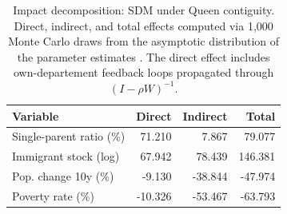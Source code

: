 \begin{table}[ht]
\centering
\caption{Impact decomposition: SDM under Queen contiguity. Direct, indirect, and total effects computed via 1{,}000 Monte Carlo draws from the asymptotic distribution of the parameter estimates \citep{lesage2009}. The direct effect includes own-departement feedback loops propagated through $(I - \rho W)^{-1}$.}
\label{tab:impacts_combined}
\begin{tabular}{lrrr}
  \toprule
  Variable & Direct & Indirect & Total \\
  \midrule
  Single-parent ratio (\%) & 71.210 & 7.867 & 79.077 \\
  Immigrant stock (log) & 67.942 & 78.439 & 146.381 \\
  Pop. change 10y (\%) & -9.130 & -38.844 & -47.974 \\
  Poverty rate (\%) & -10.326 & -53.467 & -63.793 \\
  \bottomrule
\end{tabular}
\end{table}

